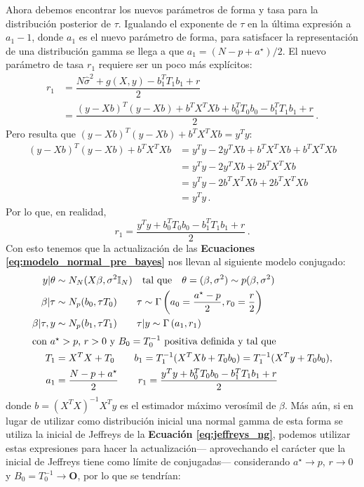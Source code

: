 Ahora debemos encontrar los nuevos parámetros de forma y tasa para la distribución posterior de $\tau$. Igualando el exponente de $\tau$ en la última expresión a $a_1-1$, donde $a_1$ es el nuevo parámetro de forma, para satisfacer la representación de una distribución gamma se llega a que $a_1=(N-p+a^\star)/2$. El nuevo parámetro de tasa $r_1$ requiere ser un poco más explícitos: 
\begin{align*}
r_1 &= \dfrac{N\hat{\sigma}^2 + g(X,y) - b_1^TT_1b_1 + r}{2} \\
&= \dfrac{(y-Xb)^T(y-Xb) + b^TX^TXb + b_0^TT_0b_0 - b_1^TT_1b_1 + r}{2} \,.
\end{align*}
Pero resulta que $(y-Xb)^T(y-Xb) + b^TX^TXb = y^Ty$: 
\begin{align} \label{eq:aux_para_jeffreys_ng}
(y-Xb)^T(y-Xb) + b^TX^TXb &= y^Ty - 2y^TXb + b^TX^TXb + b^TX^TXb \nonumber \\
&= y^Ty - 2y^TXb + 2b^TX^TXb \nonumber \\
&= y^Ty - 2b^TX^TXb + 2b^TX^TXb \nonumber \\
&= y^Ty \,.
\end{align}
Por lo que, en realidad, 
\begin{equation*}
r_1 = \dfrac{y^Ty + b_0^TT_0b_0 - b_1^TT_1b_1 + r}{2} \,.
\end{equation*}
Con esto tenemos que la actualización de las \textbf{Ecuaciones \ref{eq:modelo_normal_pre_bayes}} nos llevan al siguiente modelo conjugado: 
\begin{align} \label{eq:modelo_normal_post_bayes}
y|\theta &\sim N_N(X\beta,\sigma^2\mathbb{I}_N) \quad \text{tal que} \quad \theta = (\beta, \sigma^2) \sim p(\beta,\sigma^2) \nonumber \\
\beta|\tau &\sim N_p(b_0,\tau T_0) \qquad  \tau \sim \Gamma\left(a_0 = \dfrac{a^\star-p}{2},r_0 = \dfrac{r}{2}\right) \nonumber \\ 
\beta|\tau , y &\sim N_p(b_1,\tau T_1) \qquad \tau|y \sim \Gamma\left(a_1,r_1\right) \nonumber \\
\intertext{con $a^\star > p $, $r > 0$ y $B_0 = T_0^{-1}$ positiva definida y tal que} \nonumber
T_1 &= X^TX+T_0 \qquad b_1 = T_1^{-1}(X^TXb+T_0b_0) = T_1^{-1}(X^Ty+T_0b_0),\nonumber \\ 
a_1 &= \dfrac{N-p+a^\star}{2} \qquad r_1 = \dfrac{y^Ty + b_0^TT_0b_0 - b_1^TT_1b_1 + r}{2}
\end{align}
donde $b=(X^TX)^{-1}X^Ty$ es el estimador máximo verosímil de $\beta$. Más aún, si en lugar de utilizar como distribución inicial una normal gamma de esta forma se utiliza la inicial de Jeffreys de la \textbf{Ecuación \ref{eq:jeffreys_ng}}, podemos utilizar estas expresiones para hacer la actualización--- aprovechando el carácter que la inicial de Jeffreys tiene como límite de conjugadas--- considerando $a^\star \rightarrow p $, $r \rightarrow 0$ y $B_0 = T_0^{-1} \rightarrow \mathbf{O}$, por lo que se tendrían: 
